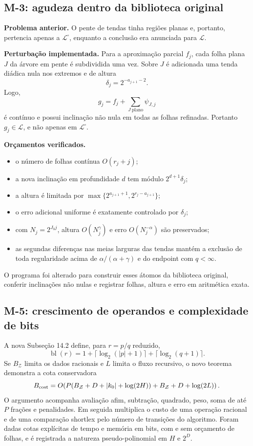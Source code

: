\documentclass[11pt,a4paper]{article}
\newcommand{\Library}{\mathcal L}
\newcommand{\LibraryMarked}{\mathcal L^{\square}}
\begin{document}
\subsection{M-3: agudeza dentro da biblioteca original}

\textbf{Problema anterior.} O pente de tendas tinha regiões planas e, portanto, pertencia
apenas a $\LibraryMarked$, enquanto a conclusão era anunciada para $\Library$.

\textbf{Perturbação implementada.} Para a aproximação parcial $f_j$, cada folha plana
$J$ da árvore em pente é subdividida uma vez. Sobre $J$ é adicionada uma tenda diádica
nula nos extremos e de altura
\[
 \delta_j=2^{-a_{j+1}-2}.
\]
Logo,
\[
 g_j=f_j+\sum_{J\ \mathrm{plano}}\psi_{J,j}
\]
é contínuo e possui inclinação não nula em todas as folhas refinadas. Portanto
$g_j\in\Library$, e não apenas em $\LibraryMarked$.

\textbf{Orçamentos verificados.}
\begin{itemize}
  \item o número de folhas contínua $O(r_j+j)$;
  \item a nova inclinação em profundidade $d$ tem módulo $2^{d+1}\delta_j$;
  \item a altura é limitada por
  $\max\{2^{a_{j+1}+1},2^{r_j-a_{j+1}}\}$;
  \item o erro adicional uniforme é exatamente controlado por $\delta_j$;
  \item com $N_j=2^{J_0j}$, altura $O(N_j^\gamma)$ e erro
  $O(N_j^{-\alpha})$ são preservados;
  \item as segundas diferenças nas meias larguras das tendas mantém a exclusão de toda
  regularidade acima de $\alpha/(\alpha+\gamma)$ e do endpoint com $q<\infty$.
\end{itemize}

O programa  foi
alterado para construir esses átomos da biblioteca original, conferir inclinações não
nulas e registrar folhas, altura e erro em aritmética exata.

\subsection{M-5: crescimento de operandos e complexidade de bits}

A nova Subseção 14.2 define, para $r=p/q$ reduzido,
\[
 \operatorname{bl}(r)=1+\lceil\log_2(|p|+1)\rceil
 +\lceil\log_2(q+1)\rceil.
\]
Se $B_{\mathcal Z}$ limita os dados racionais e $L$ limita o fluxo recursivo, o
novo teorema demonstra a cota conservadora
\[
 B_{\rm cost}=O\!\left(
 P(B_{\mathcal Z}+D+|k_0|+\log(2H))
 +B_{\mathcal Z}+D+\log(2L)\right).
\]
O argumento acompanha avaliação afim, subtração, quadrado, peso, soma de até $P$
frações e penalidades. Em seguida multiplica o custo de uma operação racional e de uma
comparação shortlex pelo número de transições do algoritmo. Foram dadas cotas explícitas
de tempo e memória em bits, com e sem orçamento de folhas, e é registrada a natureza
pseudo-polinomial em $H$ e $2^D$.
\end{document}
